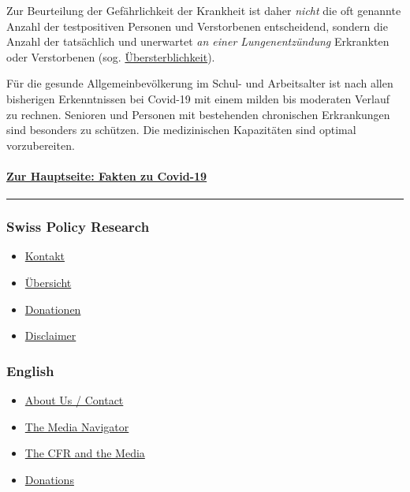 Zur Beurteilung der Gefährlichkeit der Krankheit ist daher \emph{nicht}
die oft genannte Anzahl der testpositiven Personen und Verstorbenen
entscheidend, sondern die Anzahl der tatsächlich und unerwartet \emph{an
einer Lungenentzündung} Erkrankten oder Verstorbenen (sog.
\href{https://www.euromomo.eu/index.html}{Übersterblichkeit}).

Für die gesunde Allgemeinbevölkerung im Schul- und Arbeitsalter ist nach
allen bisherigen Erkenntnissen bei Covid-19 mit einem milden bis
moderaten Verlauf zu rechnen. Senioren und Personen mit bestehenden
chronischen Erkrankungen sind besonders zu schützen. Die medizinischen
Kapazitäten sind optimal vorzubereiten.

\hypertarget{zur-hauptseite-fakten-zu-covid-19-1}{%
\paragraph{\texorpdfstring{\href{https://swprs.org/covid-19-hinweis-ii/}{Zur
Hauptseite: Fakten zu
Covid-19}}{Zur Hauptseite: Fakten zu Covid-19}}\label{zur-hauptseite-fakten-zu-covid-19-1}}

\begin{center}\rule{0.5\linewidth}{\linethickness}\end{center}

\hypertarget{swiss-policy-research}{%
\subsubsection{Swiss Policy Research}\label{swiss-policy-research}}

\begin{itemize}
\tightlist
\item
  \href{https://swprs.org/kontakt/}{Kontakt}
\item
  \href{https://swprs.org/uebersicht/}{Übersicht}
\item
  \href{https://swprs.org/donationen/}{Donationen}
\item
  \href{https://swprs.org/disclaimer/}{Disclaimer}
\end{itemize}

\hypertarget{english}{%
\subsubsection{English}\label{english}}

\begin{itemize}
\tightlist
\item
  \href{https://swprs.org/contact/}{About Us / Contact}
\item
  \href{https://swprs.org/media-navigator/}{The Media Navigator}
\item
  \href{https://swprs.org/the-american-empire-and-its-media/}{The CFR
  and the Media}
\item
  \href{https://swprs.org/donations/}{Donations}
\end{itemize}


